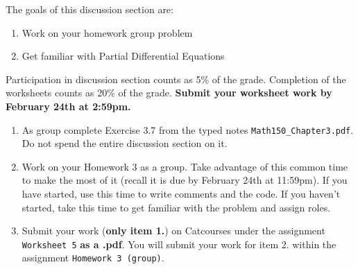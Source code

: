 \documentclass[11pt]{article}
\begin{document}
The goals of this discussion section are: 

\begin{enumerate}
\item Work on your homework group problem
\item Get familiar with Partial Differential Equations
\end{enumerate}

Participation in discussion section counts as 5\% of the grade. Completion of the worksheets counts as 20\% of the grade. \textbf{Submit your worksheet work by February 24th at 2:59pm.}

\begin{enumerate}
\item As group complete Exercise 3.7 from the typed notes \texttt{Math150\_Chapter3.pdf}. Do not spend the entire discussion section on it. 
\item Work on your Homework 3 as a group. Take advantage of this common time to make the most of it (recall it is due by February 24th at 11:59pm). If you have started, use this time to write comments and the code. If you haven't started, take this time to get familiar with the problem and assign roles.
\item Submit your work (\textbf{only item 1.}) on Catcourses under the assignment \texttt{Worksheet 5} \textbf{as a .pdf}. You will submit your work for item 2. within the assignment \texttt{Homework 3 (group)}.
\end{enumerate}
\end{document}
